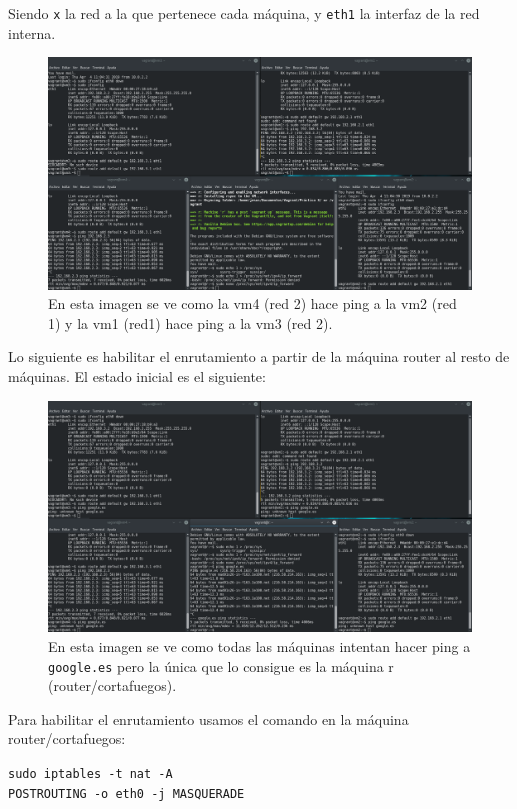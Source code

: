 \documentclass[12pt,letterpaper]{article}
\begin{document}
\begin{itemize}
	Siendo \texttt{x} la red a la que pertenece cada máquina, y \texttt{eth1} la interfaz de la red interna.
	\begin{figure}[h]
		\centering
		\includegraphics[scale=0.25]{Ping.png}
		\caption{En esta imagen se ve como la vm4 (red 2) hace ping a la vm2 (red 1) y la vm1 (red1) hace ping a la vm3 (red 2).}
	\end{figure}
	
	Lo siguiente es habilitar el enrutamiento a partir de la máquina router al resto de máquinas. El estado inicial es el siguiente:
	\newpage
	\begin{figure}[h]
		\centering
		\includegraphics[scale=0.25]{Ping2.png}
		\caption{En esta imagen se ve como todas las máquinas intentan hacer ping a \texttt{google.es} pero la única que lo consigue es la máquina r (router/cortafuegos).}
	\end{figure}

	 Para habilitar el enrutamiento usamos el comando en la máquina router/cortafuegos:
	 \begin{center}
	 	\texttt{sudo iptables -t nat -A \\POSTROUTING -o eth0 -j MASQUERADE}
	 \end{center}
 

\end{itemize}
\end{document}
